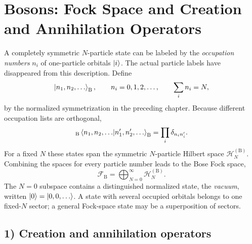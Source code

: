\section{Bosons: Fock Space and Creation and Annihilation Operators}

A completely symmetric $N$-particle state can be labeled by the \emph{occupation numbers} $n_i$ of one-particle orbitals $\left|i\right\rangle$. The actual particle labels have disappeared from this description. Define
\begin{equation}
\left|n_1,n_2,\ldots\right\rangle_{\mathrm B},\qquad
n_i=0,1,2,\ldots,\qquad\sum_i n_i=N,
\end{equation}
by the normalized symmetrization in the preceding chapter. Because different occupation lists are orthogonal,
\begin{equation}
{}_{\mathrm B}\left\langle n_1,n_2,\ldots\middle|n_1',n_2',\ldots\right\rangle_{\mathrm B}
=\prod_i\delta_{n_i n_i'}.
\end{equation}
For a fixed $N$ these states span the symmetric $N$-particle Hilbert space $\mathcal H_N^{(\mathrm B)}$. Combining the spaces for every particle number leads to the Bose Fock space,
\begin{equation}
\boxed{\mathcal F_{\mathrm B}=\bigoplus_{N=0}^\infty\mathcal H_N^{(\mathrm B)}.}
\end{equation}
The $N=0$ subspace contains a distinguished normalized state, the \emph{vacuum}, written $\left|0\right\rangle=\left|0,0,\ldots\right\rangle$. A state with several occupied orbitals belongs to one fixed-$N$ sector; a general Fock-space state may be a superposition of sectors.

\subsection*{1) Creation and annihilation operators}

